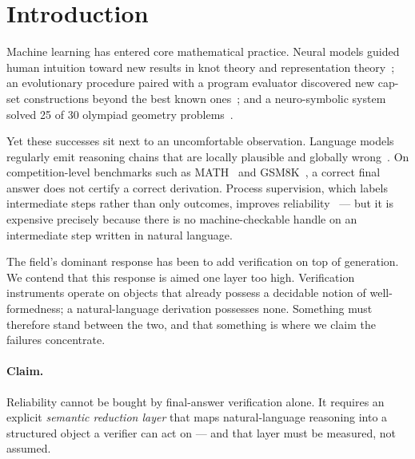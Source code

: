 \documentclass[11pt,a4paper]{article}
\begin{document}
\section{Introduction}

Machine learning has entered core mathematical practice.  Neural models guided
human intuition toward new results in knot theory and representation
theory~\cite{davies2021advancing}; an evolutionary procedure paired with a
program evaluator discovered new cap-set constructions beyond the best known
ones~\cite{romera2024funsearch}; and a neuro-symbolic system solved 25 of 30
olympiad geometry problems~\cite{trinh2024alphageometry}.

Yet these successes sit next to an uncomfortable observation.  Language models
regularly emit reasoning chains that are locally plausible and globally
wrong~\cite{wei2022chain}.  On competition-level benchmarks such as
MATH~\cite{hendrycks2021math} and GSM8K~\cite{cobbe2021gsm8k}, a correct final
answer does not certify a correct derivation.  Process supervision, which labels
intermediate steps rather than only outcomes, improves
reliability~\cite{lightman2023lets} --- but it is expensive precisely because
there is no machine-checkable handle on an intermediate step written in natural
language.

The field's dominant response has been to add verification on top of generation.
We contend that this response is aimed one layer too high.  Verification
instruments operate on objects that already possess a decidable notion of
well-formedness; a natural-language derivation possesses none.  Something must
therefore stand between the two, and that something is where we claim the
failures concentrate.

\paragraph{Claim.}
Reliability cannot be bought by final-answer verification alone.  It requires an
explicit \emph{semantic reduction layer} that maps natural-language reasoning
into a structured object a verifier can act on --- and that layer must be
measured, not assumed.
\end{document}
